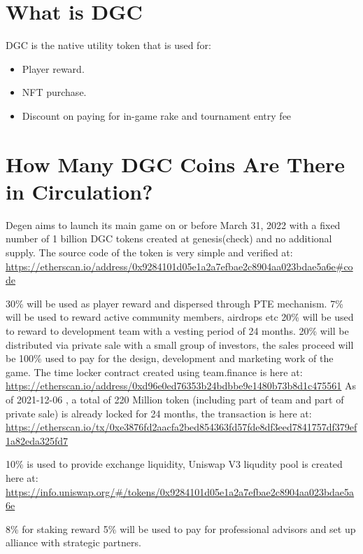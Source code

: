 \documentclass[
]{book}
\providecommand{\tightlist}{%
  \setlength{\itemsep}{0pt}\setlength{\parskip}{0pt}}
\begin{document}
\hypertarget{what-is-dgc}{%
\section{What is DGC}\label{what-is-dgc}}

DGC is the native utility token that is used for:

\begin{itemize}
\tightlist
\item
  Player reward.
\item
  NFT purchase.
\item
  Discount on paying for in-game rake and tournament entry fee
\end{itemize}

\hypertarget{how-many-dgc-coins-are-there-in-circulation}{%
\section{How Many DGC Coins Are There in Circulation?}\label{how-many-dgc-coins-are-there-in-circulation}}

Degen aims to launch its main game on or before March 31, 2022 with a fixed number of 1 billion DGC tokens created at genesis(check) and no additional supply.
The source code of the token is very simple and verified at:
\url{https://etherscan.io/address/0x9284101d05e1a2a7efbae2c8904aa023bdae5a6e\#code}

30\% will be used as player reward and dispersed through PTE mechanism.
7\% will be used to reward active community members, airdrops etc
20\% will be used to reward to development team with a vesting period of 24 months.
20\% will be distributed via private sale with a small group of investors, the sales proceed will be 100\% used to pay for the design, development and marketing work of the game.
The time locker contract created using team.finance is here at:
\url{https://etherscan.io/address/0xd96e0ed76353b24bdbbe9e1480b73b8d1c475561}
As of 2021-12-06 , a total of 220 Million token (including part of team and part of private sale) is already locked for 24 months, the transaction is here at:
\url{https://etherscan.io/tx/0xe3876fd2aacfa2bed854363fd57fde8df3eed7841757df379ef1a82eda325fd7}

10\% is used to provide exchange liquidity,
Uniswap V3 liqudity pool is created here at:
\url{https://info.uniswap.org/\#/tokens/0x9284101d05e1a2a7efbae2c8904aa023bdae5a6e}

8\% for staking reward
5\% will be used to pay for professional advisors and set up alliance with strategic partners.
\end{document}
